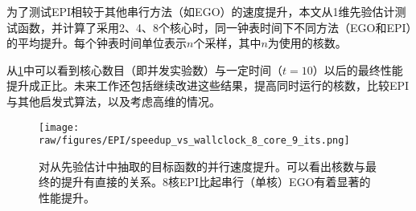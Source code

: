 \documentclass[index]{subfiles}
\begin{document}
为了测试EPI相较于其他串行方法（如EGO）的速度提升，本文从1维先验估计测试函数，并计算了采用2、4、8个核心时，同一钟表时间下不同方法（EGO和EPI）的平均提升。每个钟表时间单位表示$n$个采样，其中$n$为使用的核数。

从\cref{fig:EPI_res1}中可以看到核心数目（即并发实验数）与一定时间（$t = 10$）以后的最终性能提升成正比。未来工作还包括继续改进这些结果，提高同时运行的核数，比较EPI与其他启发式算法，以及考虑高维的情况。

\begin{figure}[hpt]
 	\centerline{\texttt{[image: raw/figures/EPI/speedup\_vs\_wallclock\_8\_core\_9\_its.png]}}
    \caption[并行速度提升]{对从先验估计中抽取的目标函数的并行速度提升。可以看出核数与最终的提升有直接的关系。8核EPI比起串行（单核）EGO有着显著的性能提升。}
 	\label{fig:EPI_res1}
\end{figure}




%
%
%
%
\end{document}
